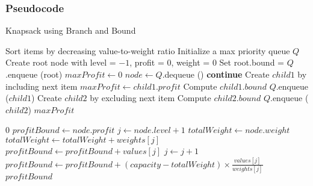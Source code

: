 \subsubsection{Pseudocode}
\begin{algorithm} [H]
    \caption{Knapsack using Branch and Bound}
    \begin{algorithmic}
        \State{} Sort items by decreasing value-to-weight ratio
        \State{} Initialize a max priority queue $Q$
        \State{} Create root node with level = $-1$, profit = $0$, weight = $0$
        \State{} Set root.bound = 
        \State{} $Q$.enqueue (root)
        \State{} $maxProfit \gets 0$
            \State{} $node \gets Q$.dequeue () 
                \State{} \textbf{continue}
            \EndIf{}
            \State{} Create $child1$ by including next item
                \State{} $maxProfit \gets child1.profit$
            \EndIf{}
            \State{} Compute $child1.bound$
                \State{} $Q$.enqueue ($child1$)
            \EndIf{}
            \State{} Create $child2$ by excluding next item
            \State{} Compute $child2.bound$
                \State{} $Q$.enqueue ($child2$)
            \EndIf{}
        \EndWhile{}
        \State{} \Return{}{} $maxProfit$
    \EndFunction{}
    
            \State{} \Return{} $0$
        \EndIf{}
        \State{} $profitBound \gets node.profit$
        \State{} $j \gets node.level + 1$
        \State{} $totalWeight \gets node.weight$
            \State{} $totalWeight \gets totalWeight + weights[j]$
            \State{} $profitBound \gets profitBound + values[j]$
            \State{} $j \gets j + 1$
        \EndWhile{}
            \State{} $profitBound \gets profitBound + (capacity - totalWeight) \times \frac{values[j]}{weights[j]}$
        \EndIf{}
        \State{} \Return{} $profitBound$
    \EndFunction{}
    \end{algorithmic}
    \end{algorithm}
